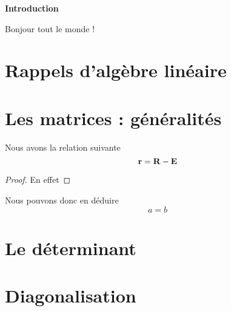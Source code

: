 \documentclass[10pt]{article}
\begin{document}
\begin{center}
\textbf{Introduction}
\end{center}


Bonjour tout le monde !


\tableofcontents

\section{Rappels d'algèbre linéaire}
\section{Les matrices : généralités}


\begin{theorem}
Nous avons la relation suivante
  \begin{equation}
    {\bf r} = {\bf R} - {\bf E}
  \end{equation}
\end{theorem}

\begin{proof}
  En effet 
\end{proof}

\begin{corol}
  Nous pouvons donc en déduire
  \begin{equation}
    a=b
  \end{equation}
\end{corol}


\section{Le déterminant}
\section{Diagonalisation}
\end{document}
